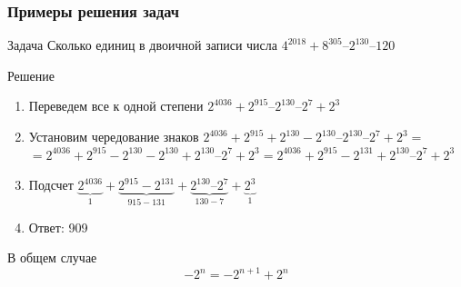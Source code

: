 \begin{frame}
  \frametitle{Примеры решения задач}
	\begin{block}{Задача}
	Сколько единиц в двоичной записи числа $4^{2018} + 8^{305} – 2^{130} – 120$
	\end{block}
	\begin{block}{Решение}
	\begin{enumerate}
	\pause
	\item Переведем все к одной степени $2^{4036} + 2^{915} – 2^{130} – 2^7+2^3$
	\pause
	\item Установим чередование знаков $2^{4036} + 2^{915} +2^{130} - 2^{130}– 2^{130} – 2^7+2^3=$\\
	$=2^{4036} + 2^{915} -2^{130} - 2^{130}+2^{130} – 2^7+2^3=2^{4036} + 2^{915} -2^{131} + 2^{130} – 2^7+2^3$
	\pause
	\item Подсчет
     $\underbrace{2^{4036}}_{1} + \underbrace{2^{915} -2^{131}}_{915-131} + \underbrace{2^{130} – 2^7}_{130-7}+\underbrace{2^3}_{1}$
		\pause
		\item Ответ: 909
	\end{enumerate}
	\pause
	
	В общем случае 
	$$
	-2^n=-2^{n+1}+2^n
	$$
	
	\end{block}
	
\end{frame}